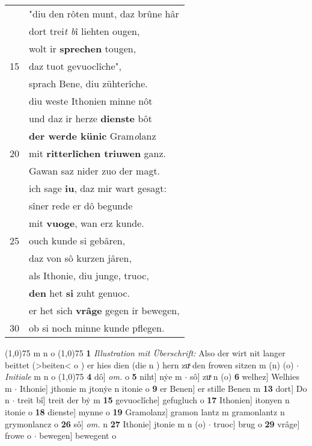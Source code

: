 \documentclass[8pt,a4paper,notitlepage]{article}
\begin{document}
\begin{table}[ht]
\begin{minipage}[t]{0.5\linewidth}
\begin{tabular}{rl}
 & "diu den rôten munt, daz brûne hâr\\ 
 & dort trei\textit{t b}î liehten ougen,\\ 
 & wolt ir \textbf{sprechen} tougen,\\ 
15 & daz tuot gevuoclîche",\\ 
 & sprach Bene, diu zühterîche.\\ 
 & diu weste Ithonien minne nôt\\ 
 & und daz ir herze \textbf{dienste} bôt\\ 
 & \textbf{der werde künic} Gram\textit{o}lanz\\ 
20 & mit \textbf{ritterlîchen triuwen} ganz.\\ 
 & Gawan saz nider zuo der magt.\\ 
 & ich sage \textbf{iu}, daz mir wart gesagt:\\ 
 & sîner rede er dô begunde\\ 
 & mit \textbf{vuoge}, wan erz kunde.\\ 
25 & ouch kunde si gebâren,\\ 
 & daz von sô kurzen jâren,\\ 
 & als Ithonie, diu junge, truoc,\\ 
 & \textbf{den} het \textbf{si} zuht genuoc.\\ 
 & er het sich \textbf{vrâge} gegen ir bewegen,\\ 
30 & ob si noch minne kunde pflegen.\\ 
\end{tabular}
\scriptsize
\line(1,0){75} \newline
m n o \newline
\line(1,0){75} \newline
\textbf{1} \textit{Illustration mit Überschrift:} Also der wirt nit langer beittet (>beiten< o  ) er hies dien (die n  ) hern zuͯ den frowen sitzen m (n) (o)   $\cdot$ \textit{Initiale} m n o  \newline
\line(1,0){75} \newline
\textbf{4} dô] \textit{om.} o \textbf{5} niht] nẏe m  $\cdot$ sô] zuͯ n (o) \textbf{6} welhez] Welhies m  $\cdot$ Ithonie] jthonie m jtonẏe n itonie o \textbf{9} er Benen] er stille Benen m \textbf{13} dort] Do n  $\cdot$ treit bî] treit der bẏ m \textbf{15} gevuoclîche] gefugluch o \textbf{17} Ithonien] itonyen n itonie o \textbf{18} dienste] mynne o \textbf{19} Gramolanz] gramon lantz m gramonlantz n grymonlancz o \textbf{26} sô] \textit{om.} n \textbf{27} Ithonie] jtonie m n (o)  $\cdot$ truoc] brug o \textbf{29} vrâge] frowe o  $\cdot$ bewegen] bewegent o \newline
\end{minipage}
\end{table}
\end{document}
